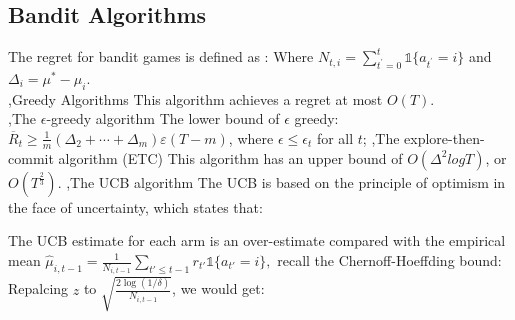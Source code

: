 \documentclass[12pt]{report}
\begin{document}
\subsection{Bandit Algorithms}

The regret for bandit games is defined as :
Where $N_{t,i}=\sum_{t^{\prime}=0}^{t}\mathbb{1}\{a_{t^{\prime}}=i\}$ and $\Delta_{i}=\mu^{*}-\mu_{i}$.\\
\sep{Greedy Algorithms}
This algorithm achieves a regret at most $O(T)$.\\
\sep{The $\epsilon$-greedy algorithm}
The lower bound of $\epsilon$ greedy: $\overline{R}_t\geq\frac1m(\Delta_2+\cdots+\Delta_m)\varepsilon(T-m)$, where $\epsilon\le \epsilon_t$ for all $t$;
\sep{The explore-then-commit algorithm (ETC)}
This algorithm has an upper bound of $O(\Delta^2 log T)$, or $O(T^{\frac{2}{3}})$.
\sep{The UCB algorithm}
The UCB is based on the principle of optimism in the face of uncertainty, which states that:
\begin{center}
\end{center}
The UCB estimate for each arm is an over-estimate compared with the empirical mean $\hat{\mu}_{i,t-1}=\frac{1}{N_{i,t-1}}\sum_{t'\le t-1}r_{t'}\mathbb{1}\{a_{t'}=i\},$ recall the Chernoff-Hoeffding bound:
Repalcing $z$ to $\sqrt{\frac{2\log(1/\delta)}{N_{i,t-1}}}$, we would get:
\end{document}
